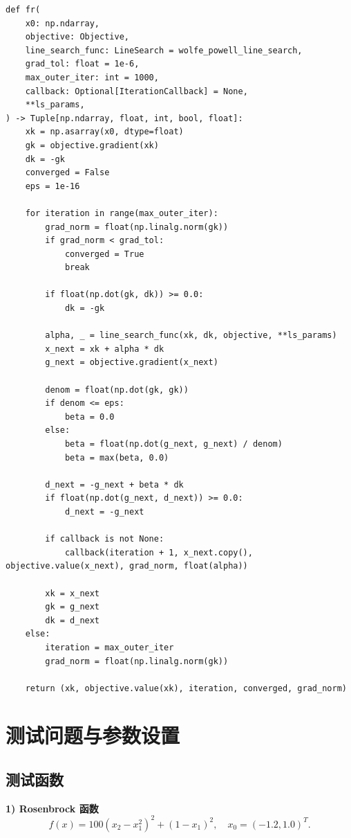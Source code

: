 \documentclass[12pt,a4paper]{ctexart}
\begin{document}
\begin{lstlisting}[caption={FR.py 中 Fletcher-Reeves 主迭代代码},label={lst:fr-impl}]
def fr(
    x0: np.ndarray,
    objective: Objective,
    line_search_func: LineSearch = wolfe_powell_line_search,
    grad_tol: float = 1e-6,
    max_outer_iter: int = 1000,
    callback: Optional[IterationCallback] = None,
    **ls_params,
) -> Tuple[np.ndarray, float, int, bool, float]:
    xk = np.asarray(x0, dtype=float)
    gk = objective.gradient(xk)
    dk = -gk
    converged = False
    eps = 1e-16

    for iteration in range(max_outer_iter):
        grad_norm = float(np.linalg.norm(gk))
        if grad_norm < grad_tol:
            converged = True
            break

        if float(np.dot(gk, dk)) >= 0.0:
            dk = -gk

        alpha, _ = line_search_func(xk, dk, objective, **ls_params)
        x_next = xk + alpha * dk
        g_next = objective.gradient(x_next)

        denom = float(np.dot(gk, gk))
        if denom <= eps:
            beta = 0.0
        else:
            beta = float(np.dot(g_next, g_next) / denom)
            beta = max(beta, 0.0)

        d_next = -g_next + beta * dk
        if float(np.dot(g_next, d_next)) >= 0.0:
            d_next = -g_next

        if callback is not None:
            callback(iteration + 1, x_next.copy(), objective.value(x_next), grad_norm, float(alpha))

        xk = x_next
        gk = g_next
        dk = d_next
    else:
        iteration = max_outer_iter
        grad_norm = float(np.linalg.norm(gk))

    return (xk, objective.value(xk), iteration, converged, grad_norm)
\end{lstlisting}

\section{测试问题与参数设置}
\subsection{测试函数}
\textbf{1) Rosenbrock 函数}
\begin{equation}
f(x)=100(x_2-x_1^2)^2+(1-x_1)^2,\quad x_0=(-1.2,1.0)^T.
\end{equation}
\end{document}
